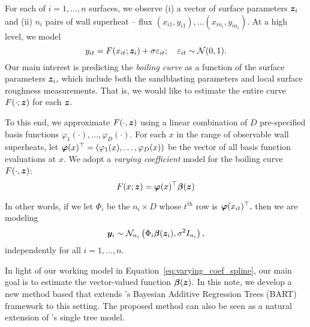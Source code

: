 For each of $i = 1, \ldots, n$ surfaces, we observe (i) a vector of surface parameters $\bm{z}_{i}$ and (ii) $n_{i}$ pairs of wall superheat -- flux  $(x_{i1}, y_{i1}), \ldots (x_{in_{i}}, y_{in_{i}}).$
At a high level, we model
$$
y_{it} = F(x_{it}; \bm{z}_{i}) + \sigma \varepsilon_{it}; \quad \varepsilon_{it} \sim \mathcal{N}(0,1).
$$
Our main interest is predicting the \textit{boiling curve} as a function of the surface parameters $\bm{z}_{i},$ which include both the sandblasting parameters and local surface roughness measurements.
That is, we would like to estimate the entire curve $F(\cdot ; \bm{z})$ for each $\bm{z}.$

To this end, we approximate $F(\cdot, \bm{z})$ using a linear combination of $D$ pre-specified basis functions $\varphi_{1}(\cdot), \ldots, \varphi_{D}(\cdot).$
For each $x$ in the range of observable wall superheats, let $\boldsymbol{\varphi}(x)^{\top} = (\varphi_{1}(x), \ldots, \varphi_{D}(x))$ be the vector of all basis function evaluations at $x.$
We adopt a \textit{varying coefficient} model for the boiling curve $F(\cdot, \bm{z})$:
\begin{equation}
\label{eq:varying_coef_spline}
F(x; \bm{z}) = \boldsymbol{\varphi}(x)^{\top}\boldsymbol{\beta}(\bm{z})
\end{equation}

In other words, if we let $\Phi_{i}$ be the $n_{i} \times D$ whose $t^{\text{th}}$ row is $\boldsymbol{\varphi}(x_{it})^{\top},$ then we are modeling
$$
\bm{y}_{i} \sim \mathcal{N}_{n_{i}}\left(\Phi_{i}\boldsymbol{\beta}(\bm{z}_{i}), \sigma^{2}I_{n_{i}}\right),
$$
independently for all $i = 1, \ldots, n.$

In light of our working model in Equation~\eqref{eq:varying_coef_spline}, our main goal is to estimate the vector-valued function $\boldsymbol{\beta}(\bm{z}).$
In this note, we develop a new method based that extends \citet{Chipman2010}'s Bayesian Additive Regression Trees (BART) framework to this setting.
The proposed method can also be seen as a natural extension of \citet{Low-Kam2015}'s single tree model.
